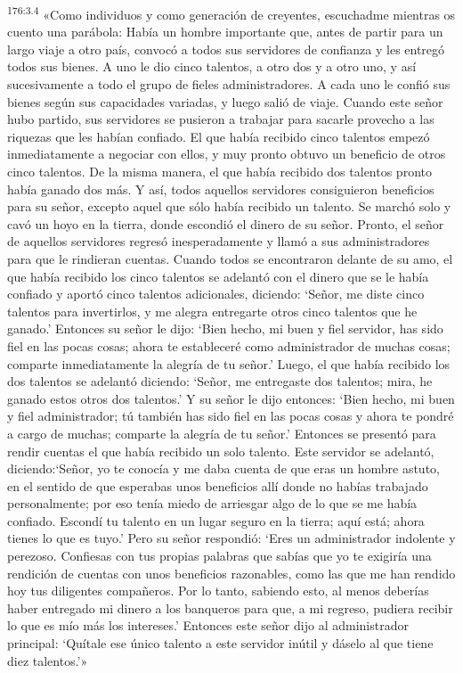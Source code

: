 \par 
\textsuperscript{176:3.4} «Como individuos y como generación de creyentes, escuchadme mientras os cuento una parábola: Había un hombre importante que, antes de partir para un largo viaje a otro país, convocó a todos sus servidores de confianza y les entregó todos sus bienes. A uno le dio cinco talentos, a otro dos y a otro uno, y así sucesivamente a todo el grupo de fieles administradores. A cada uno le confió sus bienes según sus capacidades variadas, y luego salió de viaje. Cuando este señor hubo partido, sus servidores se pusieron a trabajar para sacarle provecho a las riquezas que les habían confiado. El que había recibido cinco talentos empezó inmediatamente a negociar con ellos, y muy pronto obtuvo un beneficio de otros cinco talentos. De la misma manera, el que había recibido dos talentos pronto había ganado dos más. Y así, todos aquellos servidores consiguieron beneficios para su señor, excepto aquel que sólo había recibido un talento. Se marchó solo y cavó un hoyo en la tierra, donde escondió el dinero de su señor. Pronto, el señor de aquellos servidores regresó inesperadamente y llamó a sus administradores para que le rindieran cuentas. Cuando todos se encontraron delante de su amo, el que había recibido los cinco talentos se adelantó con el dinero que se le había confiado y aportó cinco talentos adicionales, diciendo: `Señor, me diste cinco talentos para invertirlos, y me alegra entregarte otros cinco talentos que he ganado.' Entonces su señor le dijo: `Bien hecho, mi buen y fiel servidor, has sido fiel en las pocas cosas; ahora te estableceré como administrador de muchas cosas; comparte inmediatamente la alegría de tu señor.' Luego, el que había recibido los dos talentos se adelantó diciendo: `Señor, me entregaste dos talentos; mira, he ganado estos otros dos talentos.' Y su señor le dijo entonces: `Bien hecho, mi buen y fiel administrador; tú también has sido fiel en las pocas cosas y ahora te pondré a cargo de muchas; comparte la alegría de tu señor.' Entonces se presentó para rendir cuentas el que había recibido un solo talento. Este servidor se adelantó, diciendo:`Señor, yo te conocía y me daba cuenta de que eras un hombre astuto, en el sentido de que esperabas unos beneficios allí donde no habías trabajado personalmente; por eso tenía miedo de arriesgar algo de lo que se me había confiado. Escondí tu talento en un lugar seguro en la tierra; aquí está; ahora tienes lo que es tuyo.' Pero su señor respondió: `Eres un administrador indolente y perezoso. Confiesas con tus propias palabras que sabías que yo te exigiría una rendición de cuentas con unos beneficios razonables, como las que me han rendido hoy tus diligentes compañeros. Por lo tanto, sabiendo esto, al menos deberías haber entregado mi dinero a los banqueros para que, a mi regreso, pudiera recibir lo que es mío más los intereses.' Entonces este señor dijo al administrador principal: `Quítale ese único talento a este servidor inútil y dáselo al que tiene diez talentos.'»

